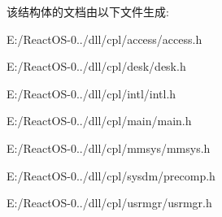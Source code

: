该结构体的文档由以下文件生成\+:\begin{DoxyCompactItemize}
\item 
E\+:/\+React\+O\+S-\/0../dll/cpl/access/access.\+h\item 
E\+:/\+React\+O\+S-\/0../dll/cpl/desk/desk.\+h\item 
E\+:/\+React\+O\+S-\/0../dll/cpl/intl/intl.\+h\item 
E\+:/\+React\+O\+S-\/0../dll/cpl/main/main.\+h\item 
E\+:/\+React\+O\+S-\/0../dll/cpl/mmsys/mmsys.\+h\item 
E\+:/\+React\+O\+S-\/0../dll/cpl/sysdm/precomp.\+h\item 
E\+:/\+React\+O\+S-\/0../dll/cpl/usrmgr/usrmgr.\+h\end{DoxyCompactItemize}
